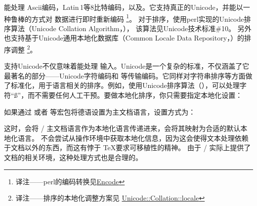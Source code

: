 \biber 能处理 Ascii编码，Latin\,1等8比特编码，以及\utf 。它支持真正的Unicode，并能以一种鲁棒的方式对 数据进行即时重新编码
\footnote{译注——perl的编码转换见\href{Encode}{Encode}}。
对于排序，\biber 使用perl实现的Unicode排序算法（Unicode Collation Algorithm，），
该算法见Unicode技术标准\#10。
另外也支持基于Unicode通用本地化数据库（Common Locale Data Repository，）的排序调整
\footnote{译注——排序的本地化调整方案见
\href{Unicode::Collation::locale}{Unicode::Collation::locale}}。



支持Unicode不仅意味着能处理 \utf 输入。Unicode是一个复杂的标准，不仅涵盖了它最著名的部分——Unicode字符编码和 \utf 等传输编码。它同样对字符串排序等方面做了标准化，用于语言相关的排序。例如，使用Unicode排序算法（），\biber 可以处理字符“ß”，而不需要任何人工干预。要做本地化排序，你只需要指定本地化设置：

\begin{ltxexample}
\usepackage[sortlocale=de]{biblatex}
\end{ltxexample}
%
如果通过  或者  等宏包将德语设置为主文档语言，设置方式为：

\begin{ltxexample}
\usepackage[sortlocale=auto]{biblatex}
\end{ltxexample}
%
这时，\biblatex 会将 / 主文档语言作为本地化语言传递进来，\biber 会将其映射为合适的默认本地化语言。
\biber 不会尝试从操作环境中获取本地化信息，因为这会使得文本处理依赖于文档以外的东西，而这有悖于 \TeX 要求可移植性的精神。
由于 /  实际上提供了文档的相关环境，这种处理方式也是合理的。

